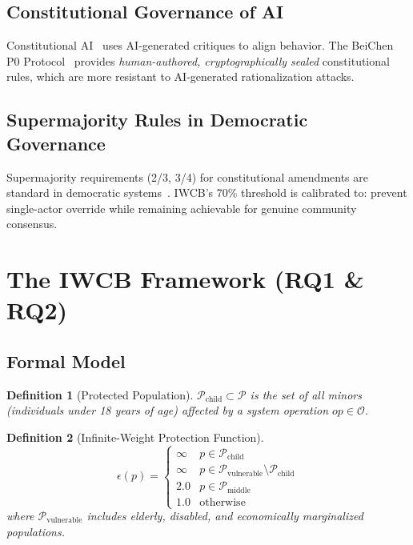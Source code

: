 \documentclass[conference]{IEEEtran}
\newtheorem{definition}{Definition}
\begin{document}
\subsection{Constitutional Governance of AI}
Constitutional AI~\cite{Bai2022} uses AI-generated
critiques to align behavior.
The BeiChen P0 Protocol~\cite{UID9622-P0-2026}
provides \emph{human-authored, cryptographically sealed}
constitutional rules, which are more resistant to
AI-generated rationalization attacks.

\subsection{Supermajority Rules in Democratic Governance}
Supermajority requirements (2/3, 3/4) for constitutional
amendments are standard in democratic systems~\cite{Elster2000}.
IWCB's 70\% threshold is calibrated to:
prevent single-actor override while remaining achievable
for genuine community consensus.

\section{The IWCB Framework (RQ1 \& RQ2)}

\subsection{Formal Model}

\begin{definition}[Protected Population]
$\mathcal{P}_{\text{child}} \subset \mathcal{P}$ is the set of
all minors (individuals under 18 years of age) affected by
a system operation $op \in \mathcal{O}$.
\end{definition}

\begin{definition}[Infinite-Weight Protection Function]
\begin{equation}
  \epsilon(p) =
  \begin{cases}
    \infty & p \in \mathcal{P}_{\text{child}} \\
    \infty & p \in \mathcal{P}_{\text{vulnerable}}
              \setminus \mathcal{P}_{\text{child}} \\
    2.0    & p \in \mathcal{P}_{\text{middle}} \\
    1.0    & \text{otherwise}
  \end{cases}
  \label{eq:epsilon}
\end{equation}
where $\mathcal{P}_{\text{vulnerable}}$ includes elderly,
disabled, and economically marginalized populations.
\end{definition}
\end{document}
